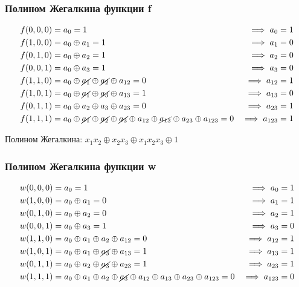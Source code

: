 \subsubsection{Полином Жегалкина функции f}
$$
\begin{align}
 & f(0,0,0) = a_{0} = 1 & \implies a_{0} = 1 \\
 & f(1,0,0) = a_{0} \oplus a_{1} = 1 & \implies a_{1} = 0  \\
 & f(0,1,0) = a_{0} \oplus a_{2} = 1  & \implies a_{2} = 0 \\
 & f(0,0,1) = a_{0} \oplus a_{3} = 1 & \implies a_{3} = 0 \\
 & f(1,1,0) = a_{0} \oplus\cancel{  a_{1} } \oplus \cancel{ a_{2} } \oplus a_{12} = 0 & \implies a_{12} = 1 \\
 & f(1,0,1) = a_{0} \oplus \cancel{ a_{1} } \oplus \cancel{ a_{3} } \oplus a_{13} = 1 & \implies a_{13} = 0 \\
 & f(0,1,1) = a_{0} \oplus a_{2} \oplus a_{3} \oplus a_{23} = 0  & \implies a_{23} = 1 \\ 
 & f(1,1,1) = a_{0} \oplus \cancel{ a_{1} } \oplus \cancel{ a_{2} } \oplus \cancel{ a_{3} } \oplus a_{12} \oplus \cancel{ a_{13} } \oplus a_{23} \oplus a_{123} = 0  & \implies a_{123} = 1
\end{align}
$$

Полином Жегалкина:
$
\boxed{
x_{1}x_{2} \oplus x_{2}x_{3} \oplus x_{1}x_{2}x_{3} \oplus 1
}
$


\subsubsection{Полином Жегалкина функции w}

$$
\begin{align}
 & w(0,0,0) = a_{0} = 1  & \implies a_{0} = 1 \\
 & w(1,0,0) = a_{0} \oplus a_{1} = 0 & \implies a_{1} = 1 \\
 & w(0,1,0) = a_{0} \oplus a_{2} = 0 & \implies a_{2} = 1 \\
 & w(0,0,1) = a_{0} \oplus a_{3} = 1 & \implies a_{3} = 0 \\
 & w(1,1,0) = a_{0} \oplus a_{1} \oplus a_{2} \oplus a_{12} = 0 & \implies a_{12} = 1 \\
 & w(1,0,1) = a_{0} \oplus a_{1} \oplus \cancel{ a_{3} } \oplus a_{13} =1  & \implies a_{13} = 1 \\
 & w(0,1,1) = a_{0} \oplus a_{2} \oplus \cancel{ a_{3} } \oplus a_{23} = 1  & \implies a_{23} = 1 \\
 & w(1,1,1) = a_{0} \oplus a_{1} \oplus a_{2} \oplus \cancel{ a_{3} } \oplus a_{12} \oplus a_{13} \oplus a_{23} \oplus a_{123} = 0 & \implies a_{123} = 0
\end{align}
$$

